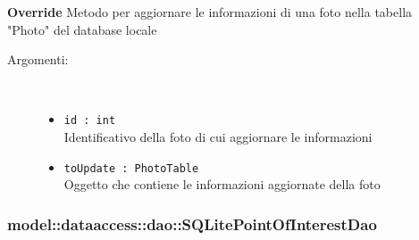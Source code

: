 \documentclass[../DefinizioneDiProdotto.tex]{subfiles}
\begin{document}
\begin{description}
\begin{itemize}
\textbf{Override} Metodo per aggiornare le informazioni di una foto nella tabella "Photo" del database locale
 \begin{description}
\item[Argomenti:] \
\begin{itemize}
\item \texttt{id : int}\\
Identificativo della foto di cui aggiornare le informazioni\item \texttt{toUpdate : PhotoTable}\\
Oggetto che contiene le informazioni aggiornate della foto\end{itemize}
\end{description}
\end{itemize}
\end{description}

\subsubsection{model::dataaccess::dao::SQLitePointOfInterestDao}
\end{document}
